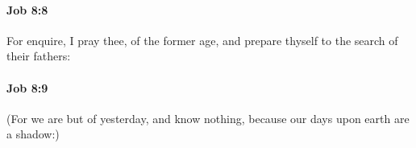 		\paragraph{Job 8:8} %
			\label{JOB-8-8}

			For enquire, I pray thee, of the former age, and prepare thyself to the search of their fathers:


		\paragraph{Job 8:9} %
			\label{JOB-8-9}

			(For we are but of yesterday, and know nothing, because our days upon earth are a shadow:)


